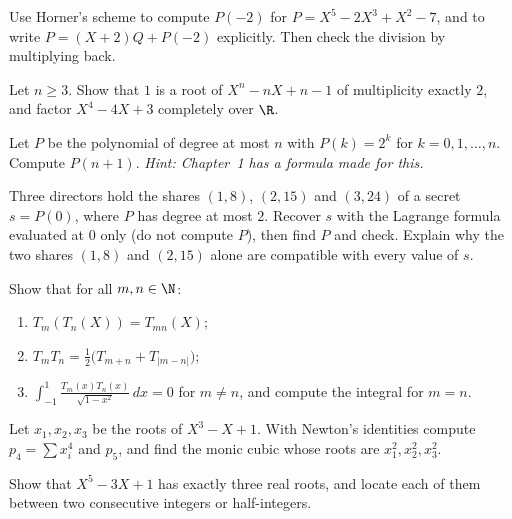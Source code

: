 \begin{exercise}[$\star$]\label{ex:horner}
Use Horner's scheme to compute $P(-2)$ for $P=X^5-2X^3+X^2-7$, and to write $P=(X+2)Q+P(-2)$ explicitly. Then check the division by multiplying back.
\end{exercise}

\begin{exercise}[$\star$]\label{ex:multroot}
Let $n\ge3$. Show that $1$ is a root of $X^n-nX+n-1$ of multiplicity exactly $2$, and factor $X^4-4X+3$ completely over $\R$.
\end{exercise}

\begin{exercise}[$\star\star$]\label{ex:lagrange2k}
Let $P$ be the polynomial of degree at most $n$ with $P(k)=2^k$ for $k=0,1,\dots,n$. Compute $P(n+1)$. \emph{Hint: Chapter~1 has a formula made for this.}
\end{exercise}

\begin{exercise}[$\star\star$]\label{ex:secret}
Three directors hold the shares $(1,8)$, $(2,15)$ and $(3,24)$ of a secret $s=P(0)$, where $P$ has degree at most $2$. Recover $s$ with the
Lagrange formula evaluated at $0$ only (do not compute $P$), then find $P$ and check. Explain why the two shares $(1,8)$ and $(2,15)$ alone are
compatible with every value of $s$.
\end{exercise}

\begin{exercise}[$\star\star$]\label{ex:chebprod}
Show that for all $m,n\in\N$:
\begin{enumerate}[label=(\alph*)]
\item $T_m(T_n(X))=T_{mn}(X)$;
\item $T_mT_n=\frac12\bigl(T_{m+n}+T_{|m-n|}\bigr)$;
\item $\displaystyle\int_{-1}^1\frac{T_m(x)T_n(x)}{\sqrt{1-x^2}}\,dx=0$ for $m\ne n$, and compute the integral for $m=n$.
\end{enumerate}
\end{exercise}

\begin{exercise}[$\star\star$]\label{ex:newtonid}
Let $x_1,x_2,x_3$ be the roots of $X^3-X+1$. With Newton's identities compute $p_4=\sum x_i^4$ and $p_5$, and find the monic cubic whose roots are
$x_1^2,x_2^2,x_3^2$.
\end{exercise}

\begin{exercise}[$\star\star$]\label{ex:descartes}
Show that $X^5-3X+1$ has exactly three real roots, and locate each of them between two consecutive integers or half-integers.
\end{exercise}

